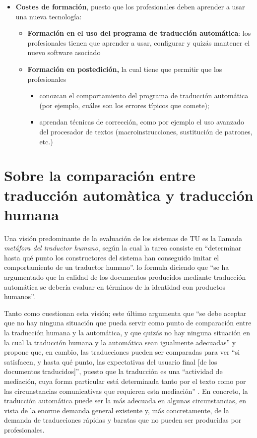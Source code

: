 \begin{itemize}
\item \textbf{Costes de formación}, puesto que los profesionales deben aprender a usar una nueva tecnología: \begin{itemize} \item \textbf{Formación en el uso del programa de traducción automática}: los profesionales tienen que aprender a usar, configurar y quizás mantener el nuevo software asociado \item \textbf{Formación en postedición,} la cual tiene que permitir que los profesionales \begin{itemize} \item conozcan el comportamiento del programa de traducción automática (por ejemplo, cuáles son los errores típicos que comete); \item aprendan técnicas de corrección, como por ejemplo el uso avanzado del procesador de textos (macroinstrucciones, sustitución de patrones, etc.) \end{itemize} \end{itemize} \end{itemize} 

\section[Traducción automática y traducción humana]{Sobre la comparación entre traducción automàtica y traducción humana} \label{ss:humaut} Una visión predominante de la evaluación de los sistemas de TU es la llamada \emph{metáfora del traductor humano}, según la cual \citep{krauwer93j} la tarea consiste en ``determinar hasta qué punto los constructores del sistema han conseguido imitar el comportamiento de un traductor humano''. \citet[p.~262]{sager93b} lo formula diciendo que ``se ha argumentado que la calidad de los documentos producidos mediante traducción automática se debería evaluar en términos de la identidad con productos humanos''. 

Tanto \citet{krauwer93j} como \citet{sager93b} cuestionan esta visión; este último argumenta que ``se debe aceptar que no hay ninguna situación que pueda servir como punto de comparación entre la traducción humana y la automática, y que quizás no hay ninguna situación en la cual la traducción humana y la automática sean igualmente adecuadas'' \citep[p.~261]{sager93b} y propone que, en cambio, las traducciones pueden ser comparadas para ver ``si satisfacen, y hasta qué punto, las expectativas del usuario final [de los documentos traducidos]'', puesto que la traducción es una ``actividad de mediación, cuya forma particular está determinada tanto por el texto como por las circunstancias comunicativas que requieren esta mediación'' \citep[p.~261]{sager93b}. En concreto, la traducción automática puede ser la más adecuada en algunas circunstancias, en vista de la enorme demanda general existente y, más concretamente, de la demanda de traducciones rápidas y baratas que no pueden ser producidas por profesionales. 

